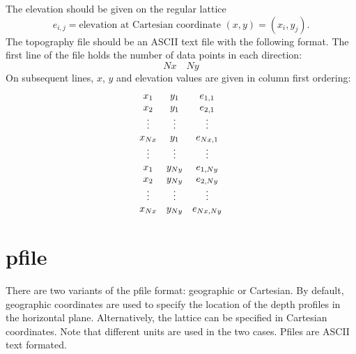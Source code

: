 \documentclass[11pt]{report}
\begin{document}
{The elevation should be given on the regular lattice
\[
	e_{i,j} = \mbox{elevation at Cartesian coordinate $(x,y)=(x_i, y_j)$.}
\]
The topography file should be an ASCII text file with the following format. The first line of the
file holds the number of data points in each direction:
\[
	Nx\quad Ny
\]
On subsequent lines, $x$, $y$ and elevation values are given in column first ordering:
\[
	\begin{array}{c c c}
		x_1    & y_1    & e_{1,1}   \\
		x_2    & y_1    & e_{2,1}   \\
		\vdots & \vdots & \vdots    \\
		x_{Nx} & y_1    & e_{Nx,1}  \\
		\vdots & \vdots & \vdots    \\
		x_1    & y_{Ny} & e_{1,Ny}  \\
		x_2    & y_{Ny} & e_{2,Ny}  \\
		\vdots & \vdots & \vdots    \\
		x_{Nx} & y_{Ny} & e_{Nx,Ny}
	\end{array}
\]

\section{pfile}\label{sec:pfile-format}

There are two variants of the pfile format: geographic or Cartesian. By default, geographic
coordinates are used to specify the location of the depth profiles in the horizontal
plane. Alternatively, the lattice can be specified in Cartesian coordinates. Note that different
units are used in the two cases. Pfiles are ASCII text formated.

}
\end{document}
